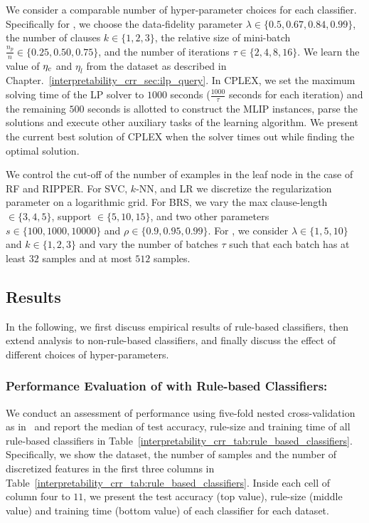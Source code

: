 


We consider a comparable number  of hyper-parameter choices  for each classifier. Specifically for {\crr}, we choose the data-fidelity parameter $ \lambda \in \{0.5, 0.67, 0.84, 0.99\} $, the number of clauses $ k \in \{1,2,3\} $, the relative size of mini-batch $ \frac{n_p}{n} \in \{0.25, 0.50, 0.75\} $, and the number of iterations $ \tau \in \{2,4,8,16\} $. We learn the value of $ \eta_c $ and $ \eta_{l} $ from the dataset as described in Chapter.~\ref{interpretability_crr_sec:ilp_query}.  In CPLEX, we set the  maximum solving time of the LP solver to $ 1000 $  seconds ($ \frac{ 1000 }{\tau} $ seconds for each iteration) and the remaining $ 500 $ seconds is allotted to construct the MLIP instances, parse the solutions and execute  other auxiliary tasks of the learning algorithm. We present the current best solution of CPLEX when the solver times out while finding the optimal solution.  

We control the cut-off of the number of examples in the leaf node in the case of RF and RIPPER. For SVC, $ k $-NN, and LR we discretize the regularization parameter on a logarithmic grid. For BRS, we vary the max clause-length $ \in \{3,4,5\} $, support $ \in  \{5,10,15\} $, and two other parameters $ s \in \{100,1000,10000\} $ and $ \rho \in \{0.9,0.95,0.99\} $.  For  {\IMLI}, we consider  $ \lambda \in \{1,5,10\} $ and  $ k \in \{1,2,3\} $ and  vary the number of batches $ \tau $ such that each batch has at least $ 32 $ samples and at most $ 512 $ samples.  




	








\subsection{Results}
In the following, we first discuss empirical results of rule-based classifiers, then extend analysis to non-rule-based classifiers, and finally discuss the effect of different choices of hyper-parameters. 
\subsubsection*{Performance Evaluation of {\crr} with Rule-based Classifiers:}
We conduct an assessment of performance  using five-fold nested cross-validation as in~\cite{DGW2018}  and report the median of test accuracy, rule-size and training time of all rule-based classifiers in Table~\ref{interpretability_crr_tab:rule_based_classifiers}. 
Specifically, we show the dataset,  the number of samples and the number of discretized features in the first three columns in Table~\ref{interpretability_crr_tab:rule_based_classifiers}. Inside each cell of column   four to $    11 $,  we present the   test accuracy (top value), rule-size (middle value) and training time (bottom value) of each classifier for each dataset. 



